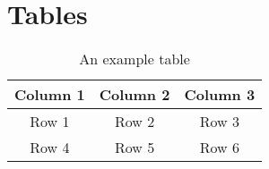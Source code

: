 \documentclass{article}
\begin{document}
\section{Tables}
\begin{table}[h]
    \centering
    \begin{tabular}{|c|c|c|}
        \hline
        Column 1 & Column 2 & Column 3 \\
        \hline
        Row 1 & Row 2 & Row 3 \\
        Row 4 & Row 5 & Row 6 \\
        \hline
    \end{tabular}
    \caption{An example table}
    \label{tab:example}
\end{table}
\end{document}

